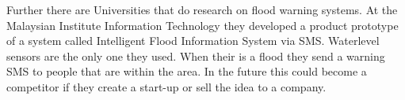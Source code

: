 Further there are Universities that do research on flood warning systems. At the Malaysian Institute Information Technology they developed a product prototype of a system called Intelligent Flood Information System via SMS. Waterlevel sensors are the only one they used. When their is a flood they send a warning SMS to people that are within the area. In the future this could become a competitor if they create a start-up or sell the idea to a company.  




